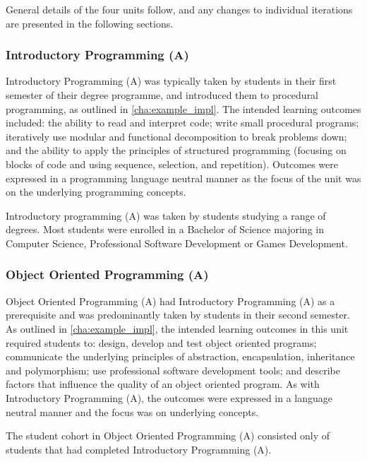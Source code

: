 General details of the four units follow, and any changes to individual iterations are presented in the following sections.

\subsubsection{Introductory Programming (A)} %
\label{ssub:introductory_programming_a}

Introductory Programming (A) was typically taken by students in their first semester of their degree programme, and introduced them to procedural programming, as outlined in \cref{cha:example_impl}. The intended learning outcomes included: the ability to read and interpret code; write small procedural programs; iteratively use modular and functional decomposition to break problems down; and the ability to apply the principles of structured programming (focusing on blocks of code and using sequence, selection, and repetition). Outcomes were expressed in a programming language neutral manner as the focus of the unit was on the underlying programming concepts.

Introductory programming (A) was taken by students studying a range of degrees. Most students were enrolled in a Bachelor of Science majoring in Computer Science, Professional Software Development or Games Development.


\subsubsection{Object Oriented Programming (A)} %
\label{ssub:object_oriented_programming_a}

Object Oriented Programming (A) had Introductory Programming (A) as a prerequisite and was predominantly taken by students in their second semester. As outlined in \cref{cha:example_impl}, the intended learning outcomes in this unit required students to: design, develop and test object oriented programs; communicate the underlying principles of abstraction, encapsulation, inheritance and polymorphism; use professional software development tools; and describe factors that influence the quality of an object oriented program. As with Introductory Programming (A), the outcomes were expressed in a language neutral manner and the focus was on underlying concepts.

The student cohort in Object Oriented Programming (A) consisted only of students that had completed Introductory Programming (A).

